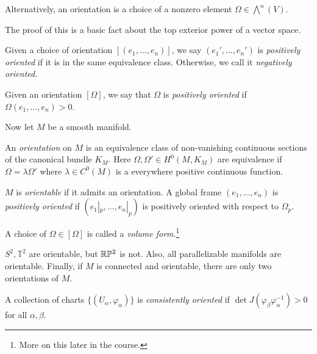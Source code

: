 \documentclass[twoside, 10pt]{article}
\begin{document}
    \begin{lem}
        Alternatively, an orientation is a choice of a nonzero element $\Omega \in \bigwedge^n(V)$.
    \end{lem}

    The proof of this is a basic fact about the top exterior power of a vector space.

    \begin{defn}
        Given a choice of orientation $[(e_1, \ldots, e_n)]$, we say $(e_1', \ldots, e_n')$ is \textit{positively oriented} if it is in the same equivalence class. Otherwise, we call it \textit{negatively oriented}.
    \end{defn}

    \begin{defn}
        Given an orientation $[\Omega]$, we say that $\Omega$ is \textit{positively oriented} if $\Omega(e_1, \ldots, e_n) > 0$.
    \end{defn}

    Now let $M$ be a smooth manifold.

    \begin{defn}
        An \textit{orientation} on $M$ is an equivalence class of non-vanishing continuous sections of the canonical bundle $K_M$. Here $\Omega, \Omega' \in H^0(M, K_M)$ are equivalence if $\Omega = \lambda \Omega'$ where $\lambda \in C^0(M)$ is a everywhere positive continuous function.
    \end{defn}

    \begin{defn}
        $M$ is \textit{orientable} if it admits an orientation. A global frame $(e_1, \ldots, e_n)$ is \textit{positively oriented} if $(e_1|_p, \ldots, e_n|_p)$ is positively oriented with respect to $\Omega_p$.
    \end{defn}

    \begin{defn}
        A choice of $\Omega \in [\Omega]$ is called a \textit{volume form}.\footnote{More on this later in the course.}
    \end{defn}

    \begin{rmk}
        $S^2, \mathbb{T}^2$ are orientable, but $\mathbb{R}\mathbb{P}^2$ is not. Also, all parallelizable manifolds are orientable. Finally, if $M$ is connected and orientable, there are only two orientations of $M$.
    \end{rmk}

    \begin{defn}
        A collection of charts $\{(U_{\alpha}, \varphi_{\alpha})\}$ is \textit{consistently oriented} if $\det J(\varphi_{\beta} \varphi_{\alpha}^{-1}) > 0$ for all $\alpha,\beta$.
    \end{defn}
\end{document}
